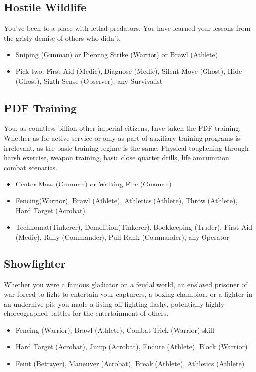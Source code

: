 \subsection{Hostile Wildlife}
You've been to a place with lethal predators. You have learned your lessons from the grisly demise of others who didn't.
\begin{itemize}
	\item Sniping (Gunman) or Piercing Strike (Warrior) or Brawl (Athlete)
	\item Pick two: First Aid (Medic), Diagnose (Medic), Silent Move (Ghost), Hide (Ghost), Sixth Sense (Observer), any Survivalist 
\end{itemize}

\subsection{PDF Training}
You, as countless billion other imperial citizens, have taken the PDF training. Whether as for active service or only as part of auxiliary training programs is irrelevant, as the basic training regime is the same. Physical toughening through harsh exercise, weapon training, basic close quarter drills, life ammunition combat scenarios.
\begin{itemize}
	\item Center Mass (Gunman) or Walking Fire (Gunman)
	\item Fencing(Warrior), Brawl (Athlete), Athletics (Athlete), Throw (Athlete), Hard Target (Acrobat)
	\item Technomat(Tinkerer), Demolition(Tinkerer), Bookkeeping (Trader), First Aid (Medic), Rally (Commander), Pull Rank (Commander), any Operator
\end{itemize}

\subsection{Showfighter}
Whether you were a famous gladiator on a feudal world, an enslaved prisoner of war forced to fight to entertain your capturers, a boxing champion, or a fighter in an underhive pit: you made a living off fighting flashy, potentially highly choreographed battles for the entertainment of others.
\begin{itemize}
	\item Fencing (Warrior), Brawl (Athlete), Combat Trick (Warrior) skill
	\item Hard Target (Acrobat), Jump (Acrobat), Endure (Athlete), Block (Warrior)
	\item Feint (Betrayer), Maneuver (Acrobat), Break (Athlete), Athletics (Athlete)
\end{itemize}

